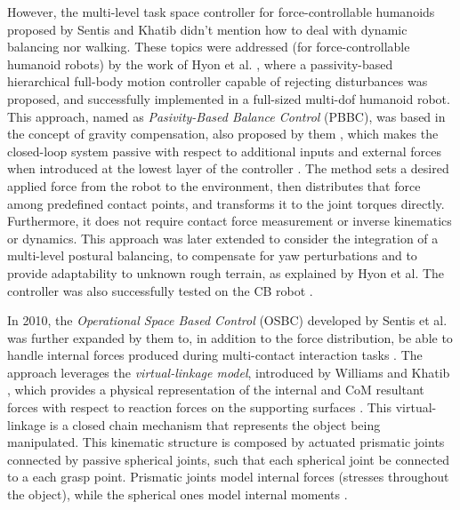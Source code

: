 	However, the multi-level task space controller for force-controllable humanoids proposed by
	Sentis and Khatib \cite{Sentis_ICRA2006} didn't mention how to deal with dynamic balancing
	nor walking.
	These topics were addressed (for force-controllable humanoid robots) by the work of Hyon et al.
	\cite{Hyon_IROS2006} \cite{Hyon_ICRA2007} \cite{Hyon_TransRobotics2007}, where a passivity-based
	hierarchical full-body motion controller capable of	rejecting disturbances was proposed,
	and successfully implemented in a full-sized multi-dof humanoid robot.
	This approach, named as \emph{Pasivity-Based Balance Control} (PBBC), was based in the concept of
	gravity compensation, also proposed by them	\cite{Hyon_Humanoids2006}, which makes the closed-loop
	system passive with respect to	additional inputs and external forces when introduced at the lowest
	layer of the controller \cite{Hyon_IROS2006}.
	The method sets a desired applied force from the robot to the environment, then distributes that force
	among predefined contact points, and transforms it to the joint torques directly.
	Furthermore, it does not require contact force measurement or inverse kinematics or dynamics.
	This approach was later extended to consider the integration of a multi-level postural balancing,
	to compensate for yaw perturbations and to provide adaptability to unknown rough terrain,
	as explained by Hyon et al. \cite{Hyon_ICRA2009} \cite{Hyon_TransRobotics2009}
	The controller was also successfully tested on the CB robot \cite{Ott_Humanoids2011}.
	
	In 2010, the \emph{Operational Space Based Control} (OSBC) developed by Sentis et al.
	\cite{Sentis_MotionPlan2010} was further expanded by them \cite{Sentis_TransRobotics2010} to,
	in addition to the force distribution, be able to handle internal forces produced during
	multi-contact interaction tasks	\cite{Ott_Humanoids2011}.
	The approach leverages the \emph{virtual-linkage model}, introduced by Williams and Khatib
	\cite{Williams_ICRA1993}, which provides a physical representation of the internal and CoM
	resultant forces with respect to reaction forces on the supporting surfaces
	\cite{Sentis_TransRobotics2010}.
	This virtual-linkage is a closed chain mechanism that represents the object being manipulated.
	This kinematic structure is composed by actuated prismatic joints connected by passive spherical
	joints, such that each spherical joint be connected to a each grasp point.
	Prismatic joints model internal forces (stresses throughout the object), while the spherical ones
	model internal moments \cite{Williams_ICRA1993}.
	
